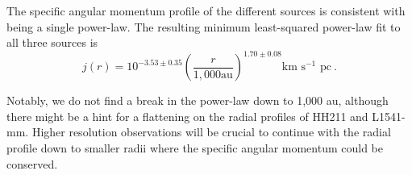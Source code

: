 The specific angular momentum profile of the different sources is consistent with being a single power-law.
The resulting minimum least-squared power-law fit to all three sources is
\begin{equation}
j(r) = 10^{-3.53\pm 0.35}\left( \frac{r}{1,000 \textrm{au}}\right)^{1.70\pm0.08} \textrm{km s$^{-1}$ pc}~.
\end{equation}

Notably, we do not find a break in the power-law down to 1,000 au, although there might be a hint 
for a flattening on the radial profiles of HH211 and L1541-mm. 
Higher resolution observations will be crucial to continue with the radial profile down to 
smaller radii where the specific angular momentum could be conserved.